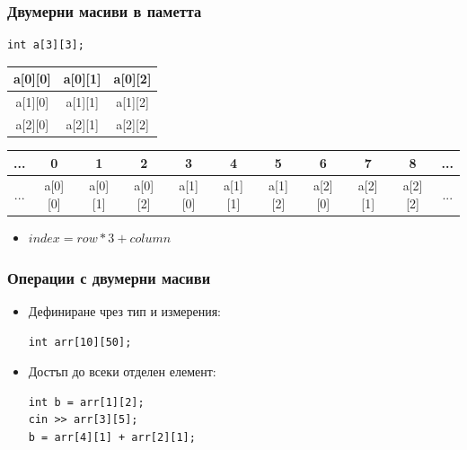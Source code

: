 \documentclass{beamer}
\begin{document}
\begin{frame}[fragile]
\frametitle{Двумерни масиви в паметта}


\begin{lstlisting}
int a[3][3];
\end{lstlisting}

\pause

\begin{flushleft}


\begin{tabular}{ | c | c | c |}
\hline
a[0][0] & a[0][1] & a[0][2] \\\hline
a[1][0] & a[1][1] & a[1][2] \\\hline
a[2][0] & a[2][1] & a[2][2] \\\hline
  
\end{tabular}
\end{flushleft}

\pause

\begin{center}
\begin{tabular}{  c | c | c | c | c | c | c | c | c | c | c }
\hline
...&0&1&2&3&4&5&6&7&8&... \\\hline
...&
a[0][0] & a[0][1] & a[0][2] &
a[1][0] & a[1][1] & a[1][2] &
a[2][0] & a[2][1] & a[2][2] &
... \\\hline
  
\end{tabular}


\end{center}

\pause

\begin{itemize}
\item $index = row * 3 + column$
\end{itemize}



\end{frame}


\begin{frame}[fragile]
\frametitle{Операции с двумерни масиви}

\begin{itemize}
  \item Дефиниране чрез тип и измерения: 

\begin{lstlisting}
int arr[10][50];
\end{lstlisting}
\pause
  \item Достъп до всеки отделен елемент:

\begin{lstlisting}
int b = arr[1][2];
cin >> arr[3][5];
b = arr[4][1] + arr[2][1];
\end{lstlisting}


\end{itemize}

\end{frame}
\end{document}
